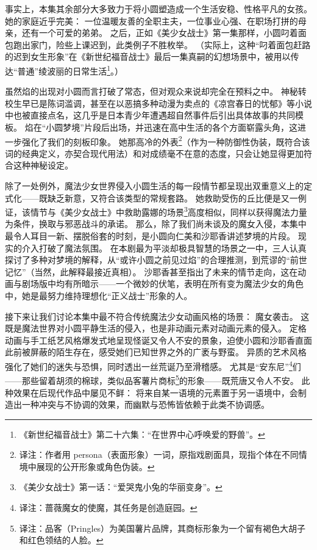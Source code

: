 事实上，本集其余部分大多致力于将小圆塑造成一个生活安稳、性格平凡的女孩。
她的家庭近乎完美：
一位温暖友善的全职主夫，一位事业心强、在职场打拼的母亲，还有一个可爱的弟弟。
之后，正如《美少女战士》第一集那样，小圆叼着面包跑出家门，险些上课迟到，此类例子不胜枚举。
（实际上，这种“叼着面包赶路的迟到女生形象”在《新世纪福音战士》最后一集真嗣的幻想场景中，被用以传达“普通”绫波丽的日常生活\footnote{%
    《新世纪福音战士》第二十六集：“在世界中心呼唤爱的野兽”。
}\cite{ref14}。）

虽然焰的出现对小圆而言打破了常态，但对观众来说却完全在预料之中。
神秘转校生早已是陈词滥调，甚至在以恶搞多种动漫为卖点的《凉宫春日的忧郁》等小说中也被直接点名\cite{ref15}，这几乎是日本青少年遭遇超自然事件后引出具体故事的共同模板。
焰在“小圆梦境”片段后出场，并迅速在高中生活的各个方面崭露头角，这进一步强化了我们的刻板印象。
她那高冷的外表\footnote{%
    译注：作者用 persona（表面形象）一词，原指戏剧面具，现指个体在不同情境中展现的公开形象或角色伪装。
}（作为一种防御性伪装，既符合该词的经典定义，亦契合现代用法）和对成绩毫不在意的态度，只会让她显得更加符合这种神秘设定。

除了一处例外，魔法少女世界侵入小圆生活的每一段情节都呈现出双重意义上的定式化——既缺乏新意，又符合该类型的常规套路。
她救助受伤的丘比便是又一例证，该情节与《美少女战士》中救助露娜的场景\footnote{%
    《美少女战士》第一话：“爱哭鬼小兔的华丽变身”。
}高度相似，同样以获得魔法力量为条件，换取与邪恶战斗的承诺。
那么，除了我们尚未谈及的魔女入侵，本集中最令人耳目一新、摆脱俗套的时刻，是小圆向仁美和沙耶香讲述梦境的片段。
现实的介入打破了魔法氛围。
在本剧最为平淡却极具智慧的场景之一中，三人认真探讨了多种对梦境的解释，从“或许小圆之前见过焰”的合理推测，到荒谬的“前世记忆”（当然，此解释最接近真相）。
沙耶香甚至指出了未来的情节走向，这在动画与剧场版中均有所暗示——一个微妙的伏笔，表明在所有变为魔法少女的角色中，她是最努力维持理想化“正义战士”形象的人。

接下来让我们讨论本集中最不符合传统魔法少女动画风格的场景：
魔女袭击。
这既是魔法世界对小圆平静生活的侵入，也是非动画元素对动画元素的侵入。
定格动画与手工纸艺风格爆发式地呈现怪诞又令人不安的景象，迫使小圆和沙耶香直面此前被屏蔽的陌生存在，感受她们已知世界之外的广袤与野蛮。
异质的艺术风格强化了她们的迷失与恐惧，同时透出一丝荒诞乃至滑稽感。
尤其是“安东尼”\footnote{%
    译注：蔷薇魔女的使魔，其任务是创造庭园。
}们——那些留着胡须的棉球，类似品客薯片商标\footnote{%
    译注：品客（Pringles）为美国薯片品牌，其商标形象为一个留有褐色大胡子和红色领结的人脸。
}的形象——既荒唐又令人不安。
此种效果在后现代作品中屡见不鲜：
将来自某一语境的元素置于另一语境中，会制造出一种冲突与不协调的效果\cite{ref16}，而幽默\cite{ref17}与恐怖\cite{ref18}皆依赖于此类不协调感。

